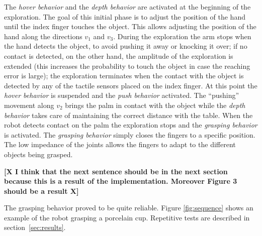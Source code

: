 The \emph{hover behavior} and the \emph{depth behavior} are
activated at the beginning of the exploration. The goal of this
initial phase is to adjust the position of the hand until the
index finger touches the object. This allows adjusting the
position of the hand along the directions $v_1$ and $v_3$. During
the exploration the arm stops when the hand detects the object, to
avoid pushing it away or knocking it over; if no contact is
detected, on the other hand, the amplitude of the exploration is
extended (this increases the probability to touch the object in
case the reaching error is large); the exploration terminates when
the contact with the object is detected by any of the tactile
sensors placed on the index finger. At this point the \emph{hover
behavior} is suspended and the \emph{push behavior} activated. The
``pushing'' movement along $v_2$ brings the palm in contact with
the object while the \emph{depth behavior} takes care of
maintaining the correct distance with the table. When the robot
detects contact on the palm the exploration stops and the
\emph{grasping behavior} is activated. The \emph{grasping
behavior} simply closes the fingers to a specific position. The
low impedance of the joints allows the fingers to adapt to the
different objects being grasped.

\textbf{[X I think that the next sentence should be in the next
section because this is a result of the implementation. Moreover
Figure 3 should be a result X]}

The grasping behavior proved to be quite reliable. Figure \ref{fig:sequence}
shows an example of the robot grasping a porcelain cup. Repetitive tests
are described in section~\ref{sec:results}.


